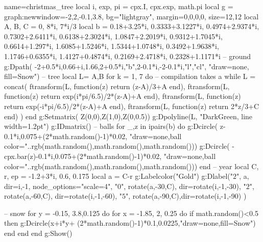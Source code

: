 \documentclass[border=5pt]{standalone}%
\begin{document}
\begin{luadraw}{name=christmas_tree}
local i, exp, pi = cpx.I, cpx.exp, math.pi
local g = graph:new{window={-2,2,-0.1,3.8}, bg="lightgray", margin={0,0,0,0}, size={12,12} } 
local A, B, C = 0, 8*i, 7*i/3
local b = { 0.18+3.25*i, 0.3333+3.1227*i, 0.4974+2.9374*i, 0.7302+2.6411*i, 0.6138+2.3024*i, 1.0847+2.2019*i, 0.9312+1.7045*i, 0.6614+1.297*i, 1.6085+1.5246*i, 1.5344+1.0748*i, 0.3492+1.9638*i, 1.1746+0.6355*i, 1.4127+0.4874*i, 0.2169+2.4718*i, 0.2328+1.1171*i }
-- ground
g:Dpath( {-2+0.5*i,0.66+i,1.66,2+0.5*i,"b",2-0.1*i,-2-0.1*i,"l","cl"}, "draw=none, fill=Snow")
-- tree
local L= {{A,B}}
for k = 1, 7 do -- compilation takes a while
    L = concat( 
            ftransform(L, function(z) return (z-A)/3+A end),
            ftransform(L, function(z) return exp(i*pi/6.5)/2*(z-A)+A end),
            ftransform(L, function(z) return exp(-i*pi/6.5)/2*(z-A)+A end),
            ftransform(L, function(z) return 2*z/3+C end)
            )
end
g:Setmatrix( {Z(0,0),Z(1,0),Z(0,0.5)})
g:Dpolyline(L, "DarkGreen, line width=1.2pt")
g:IDmatrix()
-- balls
for _,z in ipairs(b) do
    g:Dcircle( z-0.1*i,0.075+(2*math.random()-1)*0.02, "draw=none,ball color="..rgb(math.random(),math.random(),math.random()))
    g:Dcircle( -cpx.bar(z)-0.1*i,0.075+(2*math.random()-1)*0.02, "draw=none,ball color="..rgb(math.random(),math.random(),math.random()))
end
-- year
local C, r, ep = -1.2+3*i, 0.6, 0.175
local a = C-r
g:Labelcolor("Gold")
g:Dlabel("$2$", a, { dir={i,-1}, node_options="scale=4"},  "$0$", rotate(a,-30,C), {dir=rotate({i,-1},-30)}, 
"$2$", rotate(a,-60,C), {dir=rotate({i,-1},-60)},  "$5$", rotate(a,-90,C),{dir=rotate({i,-1},-90)} ) 

-- snow
for y = -0.15, 3.8,0.125  do
   for x = -1.85, 2, 0.25 do
        if math.random()<0.5 then g:Dcircle(x+i*y+ (2*math.random()-1)*0.1,0.0225,"draw=none,fill=Snow") end
   end
end 
g:Show()
\end{luadraw}
\end{document}
